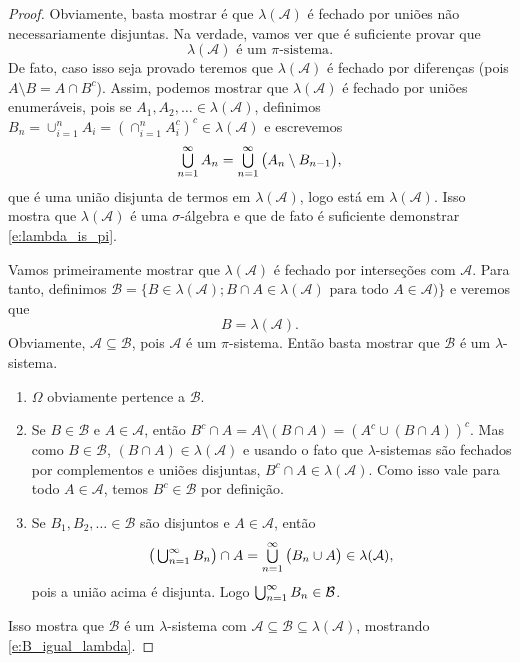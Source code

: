 \begin{proof}
  Obviamente, basta mostrar é que $\lambda(\mathcal{A})$ é fechado por uniões não necessariamente disjuntas.
  Na verdade, vamos ver que é suficiente provar que
  \begin{equation}
    \label{e:lambda_is_pi}
    \lambda(\mathcal{A}) \text{ é um $\pi$-sistema}.
  \end{equation}
  De fato, caso isso seja provado teremos que $\lambda(\mathcal{A})$ é fechado por diferenças (pois $A \setminus B = A \cap B^c$).
  Assim, podemos mostrar que $\lambda(\mathcal{A})$ é fechado por uniões enumeráveis, pois se $A_1, A_2, \dots \in \lambda(\mathcal{A})$, definimos $B_n = \cup_{i=1}^n A_i = (\cap_{i=1}^n A_i^c)^c \in \lambda(\mathcal{A})$ e escrevemos
  \begin{equation}
    \operatorname*{{\textstyle \bigcup}}_{n=1}^{\infty} A_n = \operatorname*{{\textstyle \bigcup}}_{n=1}^{\infty} \big(A_n \setminus B_{n-1} \big),
  \end{equation}
  que é uma união disjunta de termos em $\lambda(\mathcal{A})$, logo está em $\lambda(\mathcal{A})$.
  Isso mostra que $\lambda(\mathcal{A})$ é uma $\sigma$-álgebra e que de fato é suficiente demonstrar \eqref{e:lambda_is_pi}.

  Vamos primeiramente mostrar que $\lambda(\mathcal{A})$ é fechado por interseções com $\mathcal{A}$.
  Para tanto, definimos $\mathcal{B} = \big\{B \in \lambda(\mathcal{A}); \text{$B \cap A \in \lambda(\mathcal{A})$ para todo $A \in \mathcal{A}$})\big\}$ e veremos que
  \begin{equation}
    \label{e:B_igual_lambda}
    B = \lambda(\mathcal{A}).
  \end{equation}
  Obviamente, $\mathcal{A} \subseteq \mathcal{B}$, pois $\mathcal{A}$ é um $\pi$-sistema.
  Então basta mostrar que $\mathcal{B}$ é um $\lambda$-sistema.
  \begin{enumerate}[\quad a)]
  \item $\Omega$ obviamente pertence a $\mathcal{B}$.
  \item Se $B \in \mathcal{B}$ e $A \in \mathcal{A}$, então $B^c \cap A = A \setminus(B \cap A) = (A^c \cup (B \cap A))^c$.
    Mas como $B \in \mathcal{B}$, $(B \cap A) \in \lambda(\mathcal{A})$ e usando o fato que $\lambda$-sistemas são fechados por complementos e uniões disjuntas, $B^c \cap A \in \lambda(\mathcal{A})$.
    Como isso vale para todo $A \in \mathcal{A}$, temos $B^c \in \mathcal{B}$ por definição.
  \item Se $B_1, B_2, \dots \in \mathcal{B}$ são disjuntos e $A \in \mathcal{A}$, então
    \begin{equation}
      \big(\operatorname*{{\textstyle \bigcup}}\nolimits_{n=1}^{\infty} B_n \big) \cap A = \operatorname*{{\textstyle \bigcup}}_{n=1}^{\infty} \big(B_n \cup A\big) \in \lambda(\mathcal{A}),
    \end{equation}
    pois a união acima é disjunta.
    Logo $\operatorname*{{\textstyle \bigcup}}_{n=1}^{\infty} B_n \in \mathcal{B}$.
  \end{enumerate}
  Isso mostra que $\mathcal{B}$ é um $\lambda$-sistema com $\mathcal{A} \subseteq \mathcal{B} \subseteq \lambda(\mathcal{A})$, mostrando \eqref{e:B_igual_lambda}.


\end{proof}

